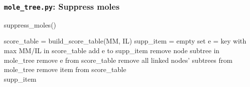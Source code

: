 \documentclass{beamer}
\begin{document}

\begin{frame}[fragile]
\frametitle{\texttt{mole\_tree.py}: Suppress moles}
\begin{algorithm}[H]
\caption{suppress\_moles()}\label{alg:cap}
\begin{algorithmic}
\State score\_table = build\_score\_table(MM, IL)
\State supp\_item = empty set
    \State e = key with max MM/IL in score\_table  
    \State add e to supp\_item  
        \State remove node subtree in mole\_tree
    \EndFor
    \State remove e from score\_table
           
            \State remove all linked nodes' subtrees from mole\_tree
            \State remove item from score\_table\\
\Return supp\_item  
\end{algorithmic}
\end{algorithm}
\end{frame}
\end{document}
